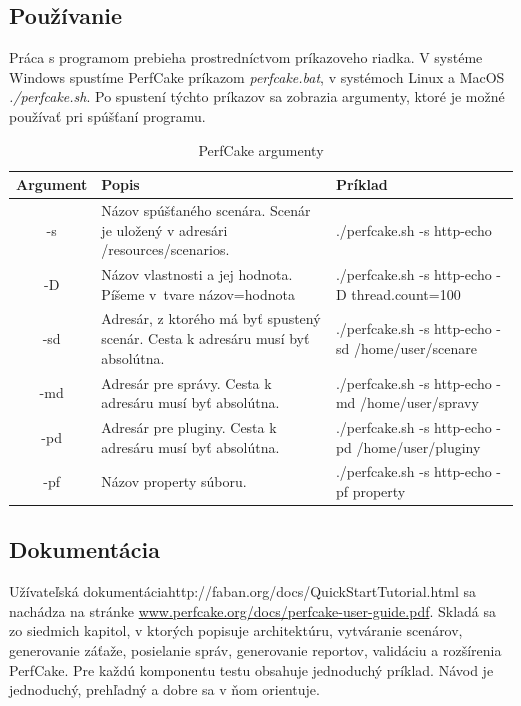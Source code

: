 \documentclass[12pt,oneside,final]{fithesis-utf8}
\begin{document}
\subsection{Používanie}
Práca s programom prebieha prostredníctvom príkazoveho riadka. V systéme Windows spustíme PerfCake príkazom \textit{perfcake.bat}, v systémoch Linux a MacOS \textit{./perfcake.sh}. Po spustení týchto príkazov sa zobrazia argumenty, ktoré je možné používať pri spúšťaní programu.
\newline
\newline
\begin{table}[h!]
\begin{center}
\begin{tabular}{| c | p{8cm} | p{5cm} |}
		\hline
		Argument & Popis & Príklad \\ \hline
		-s & Názov spúšťaného scenára. Scenár je uložený v adresári /resources/scenarios. & ./perfcake.sh -s http-echo \\ \hline
		-D & Názov vlastnosti a jej hodnota. Píšeme v~tvare názov=hodnota & ./perfcake.sh -s http-echo -D thread.count=100 \\ \hline
		-sd & Adresár, z ktorého má byť spustený scenár. Cesta k adresáru musí byť absolútna. & ./perfcake.sh -s http-echo -sd /home/user/scenare \\ \hline
		-md & Adresár pre správy. Cesta k adresáru musí byť absolútna. & ./perfcake.sh -s http-echo -md /home/user/spravy \\ \hline
		-pd & Adresár pre pluginy. Cesta k adresáru musí byť absolútna. & ./perfcake.sh -s http-echo -pd /home/user/pluginy \\ \hline
		-pf & Názov property súboru.& ./perfcake.sh -s http-echo -pf property \\ \hline
	
\end{tabular}
\end{center}
\caption{PerfCake argumenty}
\end{table}

\subsection{Dokumentácia}
Užívateľská dokumentáciahttp://faban.org/docs/QuickStartTutorial.html sa nachádza na stránke \url{www.perfcake.org/docs/perfcake-user-guide.pdf}. Skladá sa zo siedmich kapitol, v ktorých popisuje architektúru, vytváranie scenárov, generovanie záťaže, posielanie správ, generovanie reportov, validáciu a rozšírenia PerfCake. Pre každú komponentu testu obsahuje jednoduchý príklad. Návod je jednoduchý, prehľadný a dobre sa v ňom orientuje.
\end{document}
